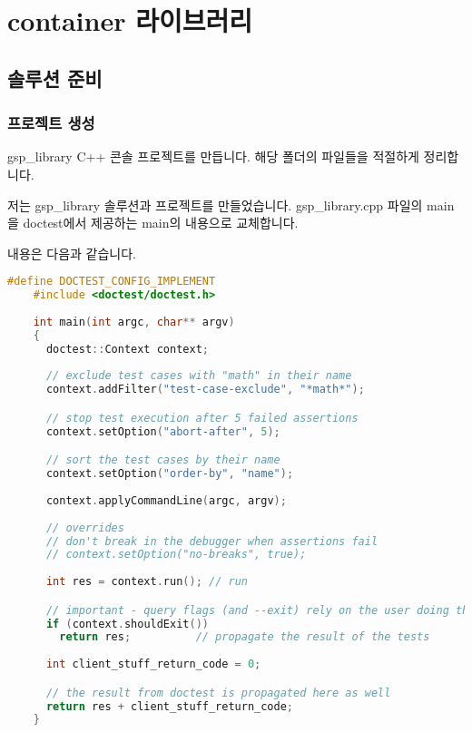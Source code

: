 \chapter{container 라이브러리}

\section{솔루션 준비}

\subsection{프로젝트 생성}

gsp\_library C++ 콘솔 프로젝트를 만듭니다. 해당 폴더의 파일들을 적절하게 정리합니다. 

저는 gsp\_library 솔루션과 프로젝트를 만들었습니다. gsp\_library.cpp 파일의 
main을 doctest에서 제공하는 main의 내용으로 교체합니다. 

내용은 다음과 같습니다. 

\begin{lstlisting}[language=c++, caption={doctest main 내용}]
    #define DOCTEST_CONFIG_IMPLEMENT
    #include <doctest/doctest.h>
    
    int main(int argc, char** argv) 
    {
      doctest::Context context;
    
      // exclude test cases with "math" in their name
      context.addFilter("test-case-exclude", "*math*"); 

      // stop test execution after 5 failed assertions
      context.setOption("abort-after", 5);              

      // sort the test cases by their name
      context.setOption("order-by", "name");  
    
      context.applyCommandLine(argc, argv);
    
      // overrides
      // don't break in the debugger when assertions fail
      // context.setOption("no-breaks", true);             
    
      int res = context.run(); // run

      // important - query flags (and --exit) rely on the user doing this
      if (context.shouldExit()) 
        return res;          // propagate the result of the tests
    
      int client_stuff_return_code = 0;

      // the result from doctest is propagated here as well
      return res + client_stuff_return_code; 
    }
\end{lstlisting}

